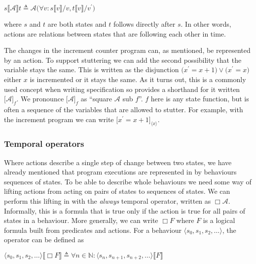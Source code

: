 \documentclass[english, biblatex, digitaloutput]{kththesis}
\begin{document}
\begin{math}
	s \llbracket \mathcal{A} \rrbracket t \triangleq \mathcal{A}\lparen \forall v : s\llbracket v \rrbracket / v, t\llbracket v \rrbracket / v^\prime \rparen
\end{math}

where $s$ and $t$ are both states and $t$ follows directly after $s$. In other words, actions are relations between states that are following each other in time.

The changes in the increment counter program can, as mentioned, be represented by an action. To support stuttering we can add the second possibility that the variable stays the same. This is written as the disjunction $\lparen x^\prime = x + 1 \rparen \lor \lparen x^\prime = x \rparen$ \ie either $x$ is incremented or it stays the same. As it turns out, this is a commonly used concept when writing specification so  provides a shorthand for it written $\lbrack \mathcal{A} \rbrack_f$. We pronounce $\lbrack \mathcal{A} \rbrack_f$ as ``square $\mathcal{A}$ sub $f$''. $f$ here is any state function, but is often a sequence of the variables that are allowed to stutter. For example, with the increment program we can write $\lbrack x^\prime = x + 1 \rbrack_{\langle x \rangle}$.

\subsubsection{Temporal operators}

Where actions describe a single step of change between two states, we have already mentioned that program executions are represented in  by behaviours \ie sequences of states. To be able to describe whole behaviours we need some way of lifting actions from acting on pairs of states to sequences of states. We can perform this lifting in  with the \textit{always} temporal operator, written as $\Box \mathcal{A}$. Informally, this is a formula that is true only if the action is true for all pairs of states in a behaviour. More generally, we can write $\Box F$ where $F$ is a logical formula built from predicates and actions. For a behaviour $\langle s_0, s_1, s_2, \dotsc \rangle$, the operator can be defined as

\begin{math}
	\langle s_0, s_1, s_2, \dotsc \rangle \llbracket \Box F \rrbracket \triangleq \forall n \in \mathbb{N} : \langle s_n, s_{n+1}, s_{n+2}, \dotsc \rangle \llbracket F \rrbracket
\end{math}
\end{document}
